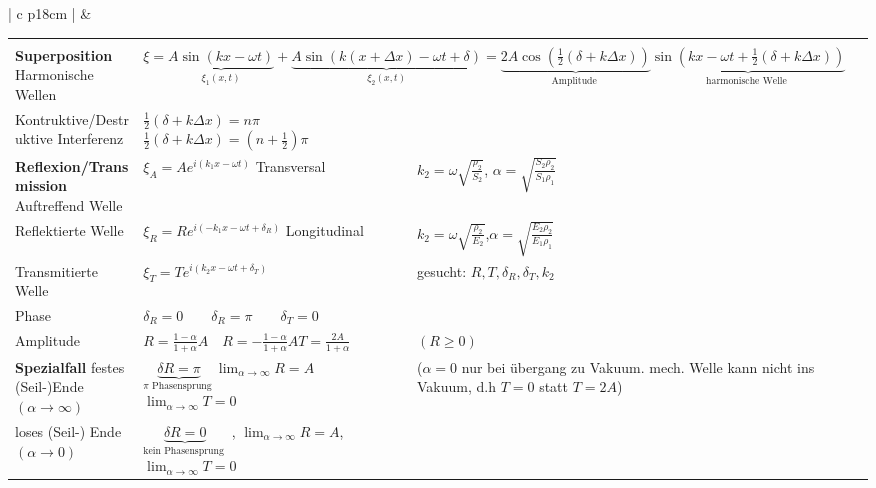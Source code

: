 	
	\begin{tabular}{ | c   p{18cm} |}
	\hline
	\rotcell{\large\textbf{\textcolor{white}{Wellen}}}  &
	\setlength{\extrarowheight}{10pt}			
	\begin{tabular}{L{5cm} L{7cm} L{5cm}}
		
		\rowcolor[rgb]{1,1,1}
		&&\\[-15pt]
		\textbf{Superposition} \qquad \qquad Harmonische Wellen &
		 \\[10pt]
		
		Kontruktive/Destruktive Interferenz&$\frac{1}{2}(\delta+k \Delta x)=n \pi$ \quad $\frac{1}{2}(\delta+k \Delta x)=\left(n+\frac{1}{2}\right) \pi$& \\
	
		\textbf{Reflexion/Transmission} Auftreffend Welle& $\displaystyle\xi_{A}=A e^{i\left(k_{1} x-\omega t\right)}$ \qquad\qquad \qquad Transversal&  $\displaystyle k_{2}=\omega \sqrt{\frac{\rho_{2}}{S_{2}}}$, $ \displaystyle \alpha=\sqrt{\frac{S_{2} \rho_{2}}{S_{1} \rho_{1}}}$\\
		Reflektierte Welle&	$\displaystyle\xi_{R}=R e^{i\left(-k_{1} x-\omega t+\delta_{R}\right)}$ \qquad\qquad Longitudinal& $\displaystyle k_{2}=\omega \sqrt{\frac{\rho_{2}}{E_{2}}}$,$\displaystyle \alpha=\sqrt{\frac{E_{2} \rho_{2}}{E_{1} \rho_{1}}}$ \\
		Transmitierte Welle&$\displaystyle \xi_{T}=T e^{i\left(k_{2} x-\omega t+\delta_{T}\right)}$&  gesucht: $\displaystyle R,T,\delta_{R}, \delta_{T}, k_{2} $ \\
		Phase &$\delta_{R}=0 \qquad \delta_{R}=\pi \qquad \delta_{T}=0$&\\
		Amplitude &$R=\frac{1-\alpha}{1+\alpha} A \quad R=-\frac{1-\alpha}{1+\alpha} A$\qquad $T=\frac{2 A}{1+\alpha}$&$(R \geq 0)$ \\
		\textbf{Spezialfall} \qquad festes (Seil-)Ende $(\alpha \rightarrow \infty)$& $\displaystyle\underbrace{\delta R=\pi}_{\pi \text { Phasensprung }}$\quad$\displaystyle\lim _{\alpha \rightarrow \infty} R=A$\quad $\displaystyle \lim _{\alpha \rightarrow \infty} T=0$ &($\alpha = 0$ nur bei übergang zu Vakuum. mech. Welle
		kann nicht ins Vakuum, d.h $T = 0$ statt $T = 2A$)\\
		loses (Seil-) Ende $(\alpha \rightarrow 0)$&$\displaystyle\underbrace{\delta R=0}_{\text {kein Phasensprung }}$ , $\displaystyle \lim _{\alpha \rightarrow \infty} R=A$, $\displaystyle\lim _{\alpha \rightarrow \infty} T=0$&\\[10pt]
	

\end{tabular}
\end{tabular}
